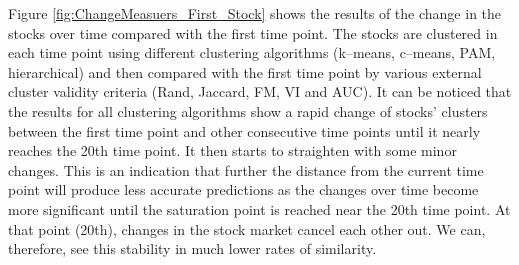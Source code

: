 Figure \ref{fig:ChangeMeasuers_First_Stock} shows the results of the change in the stocks over time compared with the first time point. The stocks are clustered in each time point using different clustering algorithms (k--means, c--means, PAM, hierarchical) and then compared with the first time point by various external cluster validity criteria (Rand, Jaccard, FM, VI and AUC). It can be noticed that the results for all clustering algorithms show a rapid change of stocks' clusters between the first time point and other consecutive time points until it nearly reaches the 20th time point. It then starts to straighten with some minor changes. This is an indication that further the distance from the current time point will produce less accurate predictions as the changes over time become more significant until the saturation point is reached near the 20th time point. At that point (20th), changes in the stock market cancel each other out. We can, therefore, see this stability in much lower rates of similarity.

